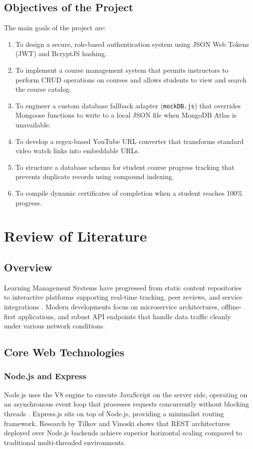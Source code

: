 \documentclass[12pt,a4paper]{report}
\begin{document}
\section{Objectives of the Project}
The main goals of the project are:
\begin{enumerate}
    \item To design a secure, role-based authentication system using JSON Web Tokens (JWT) and BcryptJS hashing.
    \item To implement a course management system that permits instructors to perform CRUD operations on courses and allows students to view and search the course catalog.
    \item To engineer a custom database fallback adapter (\texttt{mockDB.js}) that overrides Mongoose functions to write to a local JSON file when MongoDB Atlas is unavailable.
    \item To develop a regex-based YouTube URL converter that transforms standard video watch links into embeddable URLs.
    \item To structure a database schema for student course progress tracking that prevents duplicate records using compound indexing.
    \item To compile dynamic certificates of completion when a student reaches 100\% progress.
\end{enumerate}

\chapter{Review of Literature}

\section{Overview}
Learning Management Systems have progressed from static content repositories to interactive platforms supporting real-time tracking, peer reviews, and service integrations \cite{ref8}. Modern developments focus on microservice architectures, offline-first applications, and robust API endpoints that handle data traffic cleanly under various network conditions.

\section{Core Web Technologies}
\subsection{Node.js and Express}
Node.js uses the V8 engine to execute JavaScript on the server side, operating on an asynchronous event loop that processes requests concurrently without blocking threads \cite{ref9}. Express.js sits on top of Node.js, providing a minimalist routing framework. Research by Tilkov and Vinoski \cite{ref15} shows that REST architectures deployed over Node.js backends achieve superior horizontal scaling compared to traditional multi-threaded environments.
\end{document}
